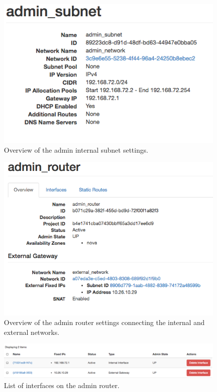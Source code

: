 \begin{figure}[H]
  \centering
  \includegraphics[scale=0.5]{img/network-adminsub-overview}
  \caption{Overview of the admin internal subnet settings.}
  \label{fig:int-subnet}
\end{figure}

\begin{figure}[H]
  \centering
  \includegraphics[scale=0.5]{img/network-adminrouter-overview}
  \caption{Overview of the admin router settings connecting the internal
and external networks.}
  \label{fig:router-overview}
\end{figure}

\begin{figure}[H]
  \centering
  \includegraphics[scale=0.40]{img/network-adminrouter-if}
  \caption{List of interfaces on the admin router.}
  \label{fig:router-if}
\end{figure}

